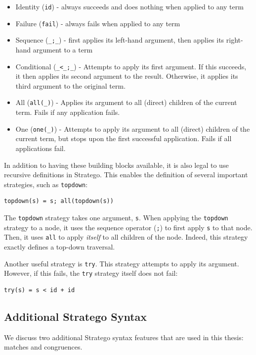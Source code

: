 \begin{itemize}
    \item Identity (\texttt{id}) - always succeeds and does nothing when applied to any term
    \item Failure (\texttt{fail}) - always fails when applied to any term
    \item Sequence (\texttt{\_;\_}) - first applies its left-hand argument, then applies its right-hand argument to a term
    \item Conditional (\texttt{\_<\_;\_}) - Attempts to apply its first argument. If this succeeds, it then applies its second argument to the result. Otherwise, it applies its third argument to the original term.
    \item All (\texttt{all(\_)}) - Applies its argument to all (direct) children of the current term. Fails if any application fails.
    \item One (\texttt{one(\_)}) - Attempts to apply its argument to all (direct) children of the current term, but stops upon the first successful application. Fails if all applications fail.
\end{itemize}

In addition to having these building blocks available, it is also legal to use recursive definitions in Stratego. This enables the definition of several important strategies, such as \texttt{topdown}:

\begin{lstlisting}[style = mystyle_small_stratego_listings]
    topdown(s) = s; all(topdown(s))
\end{lstlisting}

\noindent The \texttt{topdown} strategy takes one argument, \texttt{s}. When applying the \texttt{topdown} strategy to a node, it uses the sequence operator (\texttt{;}) to first apply \texttt{s} to that node. Then, it uses \texttt{all} to apply \textit{itself} to all children of the node. Indeed, this strategy exactly defines a top-down traversal.

Another useful strategy is \texttt{try}. This strategy attempts to apply its argument. However, if this fails, the \texttt{try} strategy itself does not fail:

\begin{lstlisting}[style = mystyle_small_stratego_listings]
    try(s) = s < id + id
\end{lstlisting}

\subsection{Additional Stratego Syntax}
\label{sec:additional-stratego-syntax}
We discuss two additional Stratego syntax features that are used in this thesis: matches and congruences.


